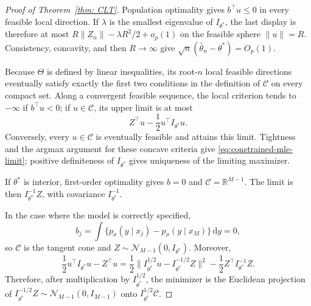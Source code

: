 \documentclass[12pt]{iopart}
\providecommand{\diff}{\mathrm{d}}
\theoremstyle{remark}
\begin{document}
\begin{proof}[Proof of Theorem~\ref{thm: CLT}]
Population optimality gives $b^\top u\leq0$ in every feasible local
direction. If $\lambda$ is the smallest eigenvalue of $I_{\theta^*}$, the
last display is therefore at most
$R\|Z_n\|-\lambda R^2/2+o_p(1)$ on the feasible sphere $\|u\|=R$.
Consistency, concavity, and then $R\to\infty$ give
$\sqrt n(\hat\theta_n-\theta^*)=O_p(1)$.

Because $\Theta$ is defined by linear inequalities, its root-$n$ local
feasible directions eventually satisfy exactly the first two conditions in
the definition of $\mathcal C$ on every compact set. Along a convergent
feasible sequence, the local criterion tends to $-\infty$ if $b^\top u<0$;
if $u\in\mathcal C$, its upper limit is at most
\[
Z^\top u-\frac12u^\top I_{\theta^*}u.
\]
Conversely, every $u\in\mathcal C$ is eventually feasible and attains this
limit. Tightness and the argmax argument for these concave criteria give
\eqref{eq:constrained-mle-limit}; positive definiteness of $I_{\theta^*}$
gives uniqueness of the limiting maximizer.

If $\theta^*$ is interior, first-order optimality gives $b=0$ and
$\mathcal C=\mathbb R^{M-1}$. The limit is then $I_{\theta^*}^{-1}Z$, with
covariance $I_{\theta^*}^{-1}$.

In the case where the model is correctly specified,
\[
b_j=\int\{p_\sigma(y\mid x_j)-p_\sigma(y\mid x_M)\}\,\diff y=0,
\]
so $\mathcal C$ is the tangent cone and
$Z\sim\mathcal N_{M-1}(0,I_{\theta^*})$. Moreover,
\[
\frac12u^\top I_{\theta^*}u-Z^\top u
=\frac12\|I_{\theta^*}^{1/2}u-I_{\theta^*}^{-1/2}Z\|^2
-\frac12Z^\top I_{\theta^*}^{-1}Z.
\]
Therefore, after multiplication by $I_{\theta^*}^{1/2}$, the minimizer is
the Euclidean projection of
$I_{\theta^*}^{-1/2}Z\sim\mathcal N_{M-1}(0,I_{M-1})$ onto
$I_{\theta^*}^{1/2}\mathcal C$.
\end{proof}
\end{document}
